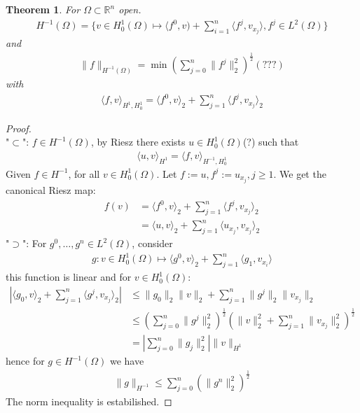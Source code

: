 \documentclass[a4paper,11pt,fleqn]{book}
\newtheorem{theorem}{Theorem}[section]
\theoremstyle{definition}
\theoremstyle{remark}
\begin{document}
\begin{theorem}
	For $\Omega \subset \mathbb{R}^n$ open. 
	\begin{align*}
		H^{-1}(\Omega) = \bigg\{ v \in H^1_0(\Omega) \mapsto \langle f^0, v) + \sum_{i = 1}^n \langle f^j, v_{x_j} \rangle, f^j \in L^2(\Omega) \bigg\}
	\end{align*}
	and 
	\begin{align*}
		\|f\|_{H^{-1}(\Omega)} = \min (\sum_{j = 0}^n \|f^j\|^2_2 )^{\frac{1}{2}}(???)
	\end{align*}
	with
	\begin{align*}
		\langle f, v \rangle_{H^1, H^1_0} = \langle f^0, v\rangle_2 +  \sum_{j = 1}^n \langle f^j, v_{x_j} \rangle_2
	\end{align*}
\end{theorem}
\begin{proof}
	\quad\\
	"$\subset$": $f \in H^{-1}(\Omega)$, by Riesz there exists $u \in H^1_0(\Omega)$(?) such that
	\begin{align*}
		\langle u, v \rangle_{H^1} = \langle f, v \rangle_{H^{-1}, H^1_0}
	\end{align*}
	Given $f \in H^{-1}$, for all $v \in H^1_0(\Omega)$. Let $f:= u, f^j:= u_{x_j}, j \geq 1$. We get the canonical Riesz map:
	\begin{align*}
		f(v) &= 
		\langle f^0, v \rangle_2 + \sum_{j = 1}^n \langle f^j, v_{x_j} \rangle_2 \\ 
		& =\langle u, v \rangle_2 + \sum_{j = 1}^n \langle u_{x_j}, v_{x_j} \rangle_2 
	\end{align*}
	"$\supset$": For $g^0, \dots, g^n \in L^2(\Omega)$, consider 
	\begin{align*}
		g: v \in H^1_0(\Omega) \mapsto \langle g^0, v \rangle_2 + \sum_{j = 1}^n \langle g_1, v_{x_i}\rangle
	\end{align*}
	this function is linear and for $v \in H^1_0(\Omega)$:
	\begin{align*}
		|\langle g_0, v \rangle_2 + \sum_{j = 1}^n \langle g^j, v_{x_j} \rangle_2 | &\le \|g_0\|_2\|v\|_2 + \sum_{j = 1}^n \|g^j\|_2\|v_{x_j}\|_2\\
		&\le (\sum_{j = 0}^n \|g^j\|^2_2)^{\frac{1}{2}} (\|v\|_2^2 + \sum_{j = 1}^n \|v_{x_j}\|_2^2)^\frac{1}{2}\\
		&= |\sum_{j = 0}^n \|g_j\|_2^2| \|v\|_{H^1}
	\end{align*}
	hence for $g \in H^{-1}(\Omega)$ we have 
	\begin{align*}
		\|g\|_{H^{-1}} \le \sum_{j = 0}^n (\| g^n\|_2^2)^{\frac{1}{2}}
	\end{align*}
	The norm inequality is estabilished. 
\end{proof}
\end{document}

